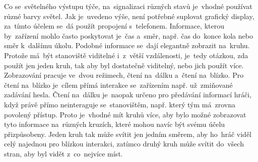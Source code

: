 


Co se~světelného výstupu týče, na~signalizaci různých stavů je~vhodné používat různé barvy světel.
Jak je~uvedeno výše, není potřebné suplovat grafický display, za~tímto účelem se~dá použít propojení s~telefonem.
Informace, kterou by~zařízení mohlo často poskytovat je~čas a~směr, např. čas do~konce kola nebo směr k~dalšímu úkolu.
Podobné informace se~dají elegantně zobrazit na~kruhu.
Protože má~být stanoviště viditelné i~z~větší vzdálenosti, je~tedy otázkou, zda použít jen jeden kruh, tak aby byl dostatečně viditelný, nebo jich použít více. %
Zobrazování pracuje ve~dvou režimech, čtení na~dálku a~čtení na~blízko.
Pro čtení na~blízko je~cílem přímá interakce se~zařízením např. už~zmiňované zadávání hesla.
Čtení na~dálku je~naopak určeno pro předávání informací hráči, když právě přímo neinteraguje se~stanovištěm, např. který tým má~zrovna povolený přístup.
Proto je~vhodné mít kruhů více, aby bylo možné zobrazovat tyto informace na~různých kruzích, které mohou navíc být svému účelu přizpůsobeny.
Jeden kruh tak může svítit jen jedním směrem, aby ho~hráč viděl celý najednou pro blízkou interakci, zatímco druhý kruh může svítit do~všech stran, aby byl vidět z~co~nejvíce míst.

